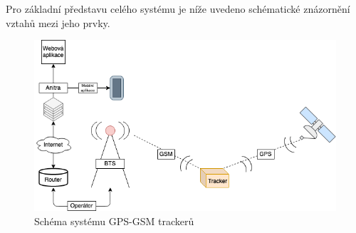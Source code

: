 Pro základní představu celého systému je níže uvedeno schématické znázornění vztahů mezi jeho prvky.

\begin{figure}[h]
	\includegraphics[width=\linewidth]{img/diagram_system.png}
	\caption{Schéma systému GPS-GSM trackerů}
	\label{fig:boat1}
\end{figure}